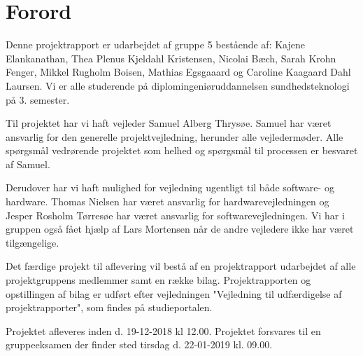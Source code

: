 \chapter{Forord}

Denne projektrapport er udarbejdet af gruppe 5 bestående af: Kajene Elankanathan, Thea Plenus Kjeldahl Kristensen, Nicolai Bæch, Sarah Krohn Fenger, Mikkel Rugholm Boisen, Mathias Egsgaaard og Caroline Kaagaard Dahl Laursen. Vi er alle studerende på diplomingeniøruddannelsen sundhedsteknologi på 3. semester. 

Til projektet har vi haft vejleder Samuel Alberg Thrysøe. Samuel har været ansvarlig for den generelle projektvejledning, herunder alle vejledermøder. Alle spørgsmål vedrørende projektet som helhed og spørgsmål til processen er besvaret af Samuel.

Derudover har vi haft mulighed for vejledning ugentligt til både software- og hardware. Thomas Nielsen har været ansvarlig for hardwarevejledningen og Jesper Rosholm Tørresøe har været ansvarlig for softwarevejledningen. Vi har i gruppen også fået hjælp af Lars Mortensen når de andre vejledere ikke har været tilgængelige. 

Det færdige projekt til aflevering vil bestå af en projektrapport udarbejdet af alle projektgruppens medlemmer samt en række bilag. Projektrapporten og opstillingen af bilag er udført efter vejledningen "Vejledning til udfærdigelse af projektrapporter", som findes på studieportalen. 

Projektet afleveres inden d. 19-12-2018 kl 12.00. Projektet forsvares til en gruppeeksamen der finder sted tirsdag d. 22-01-2019 kl. 09.00.
\clearpage